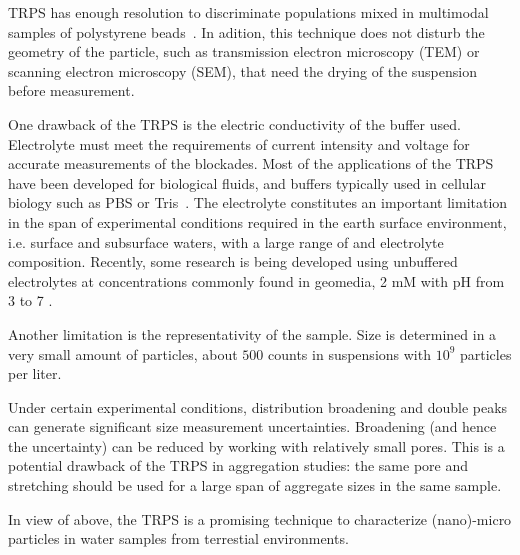 \documentclass[journal=langd5,manuscript=article]{achemso}
\begin{document}

TRPS has enough resolution to discriminate populations mixed in multimodal samples of polystyrene beads~\cite{Varenne2016MultimodalMethods}.  In adition, this technique does not disturb the geometry of the particle, such as  transmission electron microscopy (TEM) or scanning electron microscopy (SEM), that need the drying of the suspension before measurement.

One drawback of the TRPS is the electric conductivity of the buffer used. Electrolyte must meet the requirements of current intensity and voltage for accurate measurements of the blockades. Most of the applications of the TRPS have been developed for biological fluids, and buffers typically used in cellular biology  such as PBS or Tris~\cite{Lane2015}.
The electrolyte constitutes an important limitation in the span of  experimental conditions required in the  earth surface environment, i.e. surface and subsurface waters, with a large range of  and electrolyte composition. Recently, some research is being developed using unbuffered electrolytes at concentrations commonly found in geomedia, 2 mM  with   pH from  3 to 7 \cite{Mayne2016} .



%
Another limitation is the representativity of the sample. Size is determined in a very small amount of particles, about  $500$ counts in suspensions with $10^9$ particles per liter.



Under certain experimental conditions, distribution broadening and double peaks can generate significant size measurement uncertainties. Broadening (and hence the uncertainty) can be reduced by working with relatively small pores\cite{Weatherall2016}. This is a potential drawback of the TRPS in aggregation studies: the same pore and stretching  should be used for a large span of aggregate sizes in the same sample.
 


In view of above, the TRPS is a promising technique to characterize (nano)-micro particles in water samples from terrestial environments.
\end{document}
